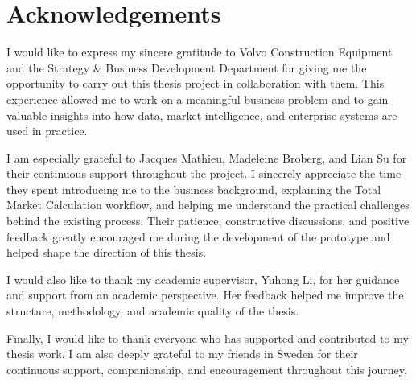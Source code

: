 \chapter*{Acknowledgements}



I would like to express my sincere gratitude to Volvo Construction Equipment and the Strategy \& Business Development Department for giving me the opportunity to carry out this thesis project in collaboration with them. This experience allowed me to work on a meaningful business problem and to gain valuable insights into how data, market intelligence, and enterprise systems are used in practice.

I am especially grateful to Jacques Mathieu, Madeleine Broberg, and Lian Su for their continuous support throughout the project. I sincerely appreciate the time they spent introducing me to the business background, explaining the Total Market Calculation workflow, and helping me understand the practical challenges behind the existing process. Their patience, constructive discussions, and positive feedback greatly encouraged me during the development of the prototype and helped shape the direction of this thesis.

I would also like to thank my academic supervisor, Yuhong Li, for her guidance and support from an academic perspective. Her feedback helped me improve the structure, methodology, and academic quality of the thesis.

Finally, I would like to thank everyone who has supported and contributed to my thesis work. I am also deeply grateful to my friends in Sweden for their continuous support, companionship, and encouragement throughout this journey.





